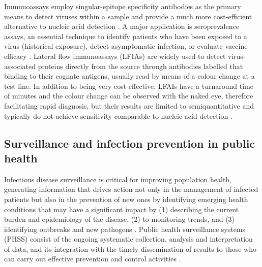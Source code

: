 Immunoassays employ singular-epitope specificity antibodies as the primary means to detect viruses within a sample and provide a much more cost-efficient alternative to nucleic acid detection \citep{cassedy_virus_2021}. 
A major application is seroprevalence assays, an essential technique to identify patients who have been exposed to a virus (historical exposure), detect asymptomatic infection, or evaluate vaccine efficacy \citep{chan_determining_2021, bobrovitz_global_2021}. 
Lateral flow immunoassays (LFIAs) are widely used to detect virus-associated proteins directly from the source through antibodies labelled that binding to their cognate antigens, usually read by means of a colour change at a test line. 
In addition to being very cost-effective, LFAIs have a turnaround time of minutes and the colour change can be observed with the naked eye, therefore facilitating rapid diagnosis, but their results are limited to semiquantitative and typically do not achieve sensitivity comparable to nucleic acid detection \citep{estrela_lateral_2016, cassedy_virus_2021, di_nardo_ten_2021}.

\subsection{Surveillance and infection prevention in public health} \label{ssec:_intro_survaillance}

Infectious disease surveillance is critical for improving population health, generating information that drives action not only in the management of infected patients but also in the prevention of new ones by identifying emerging health conditions that may have a significant impact by (1) describing the current burden and epidemiology of the disease, (2) to monitoring trends, and (3) identifying outbreaks and new pathogens \citep{groseclose_public_2017, murray_infectious_2017}. 
Public health surveillance systems (PHSS) consist of the ongoing systematic collection, analysis and interpretation of data, and its integration with the timely dissemination of results to those who can carry out effective prevention and control activities \citep{teutsch_considerations_2010}. 

